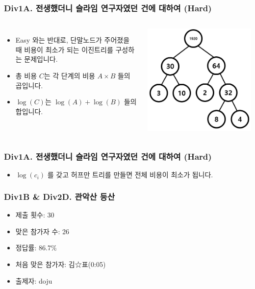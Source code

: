 \documentclass[xetex]{beamer}
\begin{document}
\begin{frame}
  \frametitle{Div1A. 전생했더니 슬라임 연구자였던 건에 대하여 (Hard)}
  \begin{columns}
      \begin{itemize}
        \item Easy 와는 반대로, 단말노드가 주어졌을 때 비용이 최소가 되는 이진트리를 구성하는 문제입니다.
        \item 총 비용 $C$는 각 단계의 비용 $A \times B$ 들의 곱입니다.
        \item $\log(C)$는 $\log(A) + \log(B)$ 들의 합입니다.
      \end{itemize}
      \includegraphics[width=1\textwidth]{slime2-sol-0.png}
  \end{columns}
\end{frame}

\begin{frame}
  \frametitle{Div1A. 전생했더니 슬라임 연구자였던 건에 대하여 (Hard)}
  \begin{itemize}
    \item $\log(c_i)$ 를 갖고 허프만 트리를 만들면 전체 비용이 최소가 됩니다.
  \end{itemize}
\end{frame}

\begin{frame}
  \frametitle{Div1B \& Div2D. 관악산 등산}
  \begin{itemize}
    \item 제출 횟수: 30
    \item 맞은 참가자 수: 26
    \item 정답률: 86.7\%
    \item 처음 맞은 참가자: 김☆표(0:05)
    \item 출제자: doju
  \end{itemize}
\end{frame}
\end{document}
